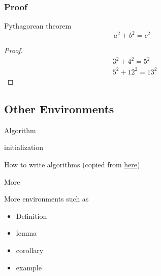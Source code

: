 \begin{frame}
    \frametitle{Proof}

    \begin{block}{Pythagorean theorem}
        \vspace*{-\baselineskip}\setlength\belowdisplayshortskip{0.1pt}
        $$a^2 + b^2 = c^2$$
    \end{block}
    
    \vspace{0.4cm}

    \begin{proof}
        \vspace*{-\baselineskip}\setlength\belowdisplayshortskip{0pt}
        \begin{align*}
            &3^2 + 4^2 = 5^2\\
            &5^2 + 12^2 = 13^2
        \end{align*}
    \end{proof}
    
\end{frame}

\subsection{Other Environments}

\begin{frame}{Algorithm}
    
    \begin{algorithm}[H]
        initialization\;
        \caption{How to write algorithms
        (copied from \href{https://en.wikibooks.org/wiki/LaTeX/Algorithms}{here})}
        \end{algorithm}
\end{frame}

\begin{frame}{More}

    More environments such as

    \begin{itemize}
        \item Definition
        \item lemma
        \item corollary
        \item example
    \end{itemize}
    
\end{frame}


